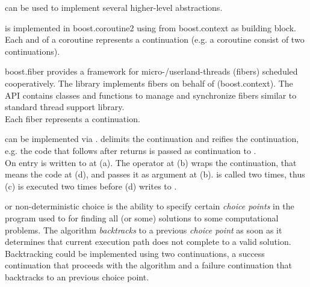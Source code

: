 
\cc can be used to implement several higher-level abstractions.



is implemented in boost.coroutine2\cite{bcoroutine2} using \cc from
boost.context\cite{bcontext} as building block. Each  and
 of a coroutine represents a continuation (e.g. a coroutine
consist of two continuations).



boost.fiber\cite{bfiber} provides a framework for micro-/userland-threads
(fibers) scheduled cooperatively. The library implements fibers on behalf of \cc
(boost.context\cite{bcontext}). The API contains classes and functions to manage
and synchronize fibers similar to standard thread support library.\\
Each fiber represents a continuation.



can be implemented via \cc.  delimits the continuation and
 reifies the continuation, e.g. the code that follows after
 returns is passed as continuation to .\\

On entry  is written to  at (a). The  operator
at (b) wraps the continuation, that means the code at (d), and passes it as
argument  at (b).  is called two times, thus (c) is
executed two times before (d) writes  to .



or non-deterministic choice is the ability to specify certain
\emph{choice points} in the program used to for finding all (or some) solutions
to some computational problems. The algorithm \emph{backtracks} to a previous
\emph{choice point} as soon as it determines that current execution path does
not complete to a valid solution.\\
Backtracking could be implemented using two continuations, a success
continuation that proceeds with the algorithm and a failure continuation that
backtracks to an previous choice point\cite{Ferguson}.
